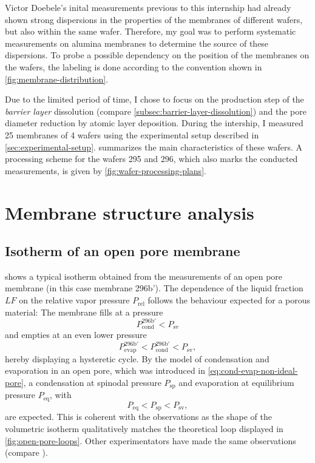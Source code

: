 \documentclass[../thesis.tex]{subfiles}
\begin{document}
        Victor Doebele's inital measurements previous to this internship had already shown strong dispersions in the properties of the membranes of different wafers, but also within the same wafer. Therefore, my goal was to perform systematic measurements on alumina membranes to determine the source of these dispersions. To probe a possible dependency on the position of the membranes on the wafers, the labeling is done according to the convention shown in \cref{fig:membrane-distribution}.

        Due to the limited period of time, I chose to focus on the production step of the \textit{barrier layer} dissolution (compare \cref{subsec:barrier-layer-dissolution}) and the pore diameter reduction by atomic layer deposition. During the intership, I measured 25 membranes of 4 wafers using the experimental setup described in \cref{sec:experimental-setup}.  summarizes the main characteristics of these wafers. A processing scheme for the wafers 295 and 296, which also marks the conducted measurements, is given by \cref{fig:wafer-processing-plans}.
        \medskip

        


    \section{Membrane structure analysis}

      \subsection{Isotherm of an open pore membrane}
      \label{subsec:open-pore-isotherm}

         shows a typical isotherm obtained from the measurements of an open pore membrane (in this case membrane 296b'). The dependence of the liquid fraction $LF$ on the relative vapor pressure $P_\mathrm{rel}$ follows the behaviour expected for a porous material: The membrane fills at a pressure
        \begin{equation*}
          P_\mathrm{cond}^\mathrm{296b'}<P_\mathrm{sv}
        \end{equation*}
        and empties at an even lower pressure
        \begin{equation*}
            P_\mathrm{evap}^\mathrm{296b'}<P_\mathrm{cond}^\mathrm{296b'}<P_\mathrm{sv},
        \end{equation*}
        hereby displaying a hysteretic cycle. By the model of condensation and evaporation in an open pore, which was introduced in \cref{eq:cond-evap-non-ideal-pore}, a condensation at spinodal pressure $P_\mathrm{sp}$ and evaporation at equilibrium pressure $P_\mathrm{eq}$, with
        \begin{equation*}
          P_\mathrm{eq}<P_\mathrm{sp}<P_\mathrm{sv},
        \end{equation*}
        are expected. This is coherent with the observations as the shape of the volumetric isotherm qualitatively matches the theoretical loop displayed in \cref{fig:open-pore-loops}. Other experimentators have made the same observations (compare \cite{Casanova2008a,Bruschi2015a}).
\end{document}
